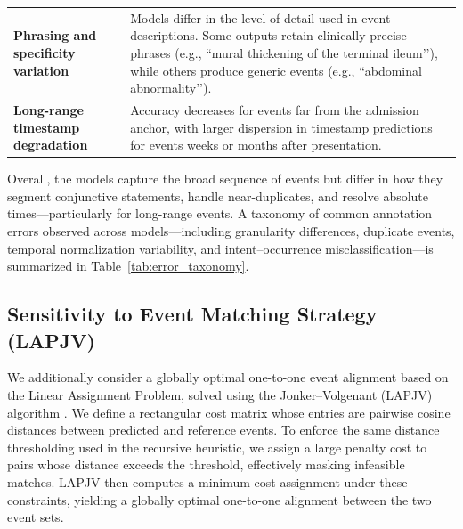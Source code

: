 \begin{table}[h!]
\begin{tabular}{p{3.2cm} p{9cm}}
\textbf{Phrasing and specificity variation} 
& Models differ in the level of detail used in event descriptions.  
Some outputs retain clinically precise phrases (e.g., ``mural thickening of the terminal ileum’’), while others produce generic events (e.g., ``abdominal abnormality’’). \\[6pt]

\textbf{Long-range timestamp degradation} 
& Accuracy decreases for events far from the admission anchor, with larger dispersion in timestamp predictions for events weeks or months after presentation. \\
\bottomrule
\end{tabular}
\vspace{-5mm}
\end{table}

Overall, the models capture the broad sequence of events but differ in how they segment conjunctive statements, handle near-duplicates, and resolve absolute times—particularly for
long-range events. A taxonomy of common annotation errors observed across models—including granularity differences, duplicate events, temporal normalization variability, and intent–occurrence misclassification—is summarized in Table~\ref{tab:error_taxonomy}.


\subsection{Sensitivity to Event Matching Strategy (LAPJV)}
\label{apd:lapjv-matching}
We additionally consider a globally optimal one-to-one event alignment based on the Linear Assignment Problem, solved using the Jonker--Volgenant (LAPJV) algorithm \citep{jonker1987shortest}. We define a rectangular cost matrix whose entries are pairwise cosine distances between predicted and reference events. To enforce the same distance thresholding used in the recursive heuristic, we assign a large penalty cost to pairs whose distance exceeds the threshold, effectively masking infeasible matches. LAPJV then computes a minimum-cost assignment under these constraints, yielding a globally optimal one-to-one alignment between the two event sets.

